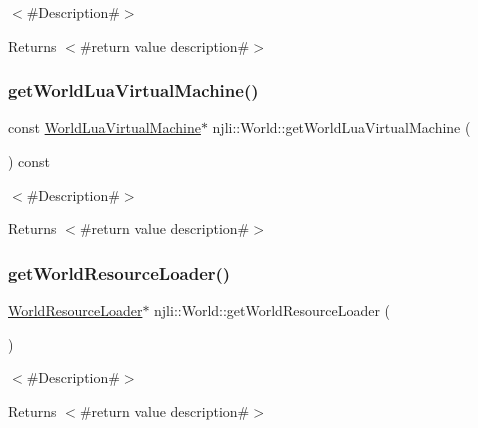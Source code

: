 $<$\#\+Description\#$>$

\begin{DoxyReturn}{Returns}
$<$\#return value description\#$>$ 
\end{DoxyReturn}
\mbox{\label{classnjli_1_1_world_a82f0b1f8d27a311ec99b67d778e121a5}} 
\subsubsection{\texorpdfstring{get\+World\+Lua\+Virtual\+Machine()}{getWorldLuaVirtualMachine()}\hspace{0.1cm}{\footnotesize\ttfamily [2/2]}}
{\footnotesize\ttfamily const \mbox{\hyperlink{classnjli_1_1_world_lua_virtual_machine}{World\+Lua\+Virtual\+Machine}}$\ast$ njli\+::\+World\+::get\+World\+Lua\+Virtual\+Machine (\begin{DoxyParamCaption}{ }\end{DoxyParamCaption}) const}

$<$\#\+Description\#$>$

\begin{DoxyReturn}{Returns}
$<$\#return value description\#$>$ 
\end{DoxyReturn}
\mbox{\label{classnjli_1_1_world_a094d454c35f0afea279bb5fbb39c196a}} 
\subsubsection{\texorpdfstring{get\+World\+Resource\+Loader()}{getWorldResourceLoader()}\hspace{0.1cm}{\footnotesize\ttfamily [1/2]}}
{\footnotesize\ttfamily \mbox{\hyperlink{classnjli_1_1_world_resource_loader}{World\+Resource\+Loader}}$\ast$ njli\+::\+World\+::get\+World\+Resource\+Loader (\begin{DoxyParamCaption}{ }\end{DoxyParamCaption})}

$<$\#\+Description\#$>$

\begin{DoxyReturn}{Returns}
$<$\#return value description\#$>$ 
\end{DoxyReturn}
\mbox{\label{classnjli_1_1_world_a78357165d6bc4ef06ef774d4e0606bc9}} 
